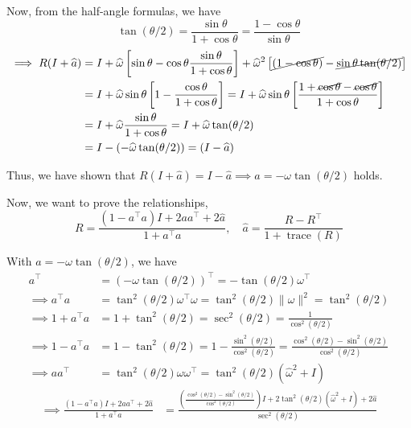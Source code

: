 Now, from the half-angle formulas, we have
\begin{equation*}
    \tan (\theta / 2)
    =
    \frac{\sin \theta}{1 + \cos \theta}
    =
    \frac{1 - \cos \theta}{\sin \theta}
\end{equation*}
\begin{align*}
    \implies
    R(I + \widehat{a})
     & =
    I + \widehat{\omega} \left[ \sin \theta - \cos \theta \frac{\sin \theta}{1 + \cos \theta} \right] + \widehat{\omega}^{2} \left[\cancel{(1 - \cos \theta)} - \cancel{\sin \theta \tan(\theta / 2)} \right]
    \\ & =
    I + \widehat{\omega} \sin \theta \left[ 1 - \frac{\cos \theta}{1 + \cos \theta} \right]
    =
    I + \widehat{\omega} \sin \theta \left[ \frac{1 + \cancel{\cos \theta} - \cancel{\cos \theta}}{1 + \cos \theta} \right]
    \\ & =
    I + \widehat{\omega} \frac{\sin \theta}{1 + \cos \theta}
    =
    I + \widehat{\omega} \tan(\theta / 2)
    \\ & =
    I - (-\widehat{\omega} \tan(\theta / 2))
    =
    (I - \widehat{a})
\end{align*}

Thus, we have shown that \( R(I + \widehat{a}) = I - \widehat{a} \implies \boxed{a = -\omega \tan(\theta / 2)} \) holds.

\vspace{1em}
Now, we want to prove the relationships,
\[
    R = \frac{(1 - a^{\top} a) I + 2 a a^{\top} + 2 \widehat{a}}{1 + a^{\top} a}, \quad \widehat{a} = \frac{R - R^{\top}}{1 + \operatorname{trace}(R)}
\]

With \( a = -\omega \tan(\theta / 2) \), we have
\begin{align*}
    a^\top
     & =
    {(-\omega \tan(\theta / 2))}^\top
    =
    -\tan(\theta / 2) \omega^\top
    \\
    \implies
    a^{\top} a
     & =
    \tan^{2}(\theta / 2) \omega^\top \omega
    =
    \tan^{2}(\theta / 2) \| \omega \|^{2}
    =
    \tan^{2}(\theta / 2)
    \\
    \implies
    1 + a^{\top} a
     & =
    1 + \tan^{2}(\theta / 2)
    =
    \sec^{2}(\theta / 2)
    =
    \frac{1}{\cos^{2}(\theta / 2)}
    \\
    \implies
    1 - a^{\top} a
     & =
    1 - \tan^{2}(\theta / 2)
    =
    1 - \frac{\sin^{2}(\theta / 2)}{\cos^{2}(\theta / 2)}
    =
    \frac{\cos^{2}(\theta / 2) - \sin^{2}(\theta / 2)}{\cos^{2}(\theta / 2)}
    \\
    \implies
    a a^{\top}
     & =
    \tan^{2}(\theta / 2) \omega \omega^{\top}
    =
    \tan^{2}(\theta / 2) (\widehat{\omega}^2 + I)
\end{align*}
\begin{align*}
    \implies
    \frac{(1 - a^{\top} a) I + 2 a a^{\top} + 2 \widehat{a}}{1 + a^{\top} a}
     & =
    \frac{\left( \frac{\cos^{2}(\theta / 2) - \sin^{2}(\theta / 2)}{\cos^{2}(\theta / 2)} \right) I + 2 \tan^{2}(\theta / 2) (\widehat{\omega}^2 + I) + 2 \widehat{a}}{\sec^{2}(\theta / 2)}
\end{align*}
